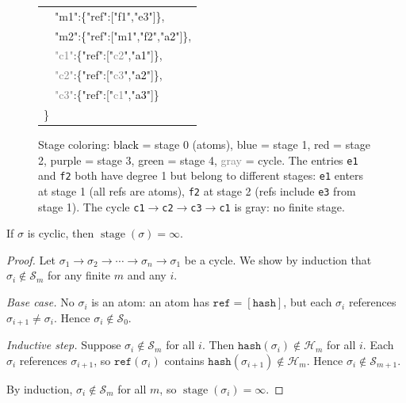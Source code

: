 \begin{figure}[ht]
\begin{minipage}[t]{0.48\textwidth}
{\begin{tabular}{@{}l@{}}
\ \ \textcolor{violet!70!black}{"m1"}:\{"ref":["\textcolor{red!70!black}{f1}","\textcolor{blue!70!black}{e3}"]\},\\
\ \ \textcolor{green!50!black}{"m2"}:\{"ref":["\textcolor{violet!70!black}{m1}","\textcolor{red!70!black}{f2}","\textcolor{black}{a2}"]\},\\
\ \ \textcolor{gray}{"c1"}:\{"ref":["\textcolor{gray}{c2}","\textcolor{black}{a1}"]\},\\
\ \ \textcolor{gray}{"c2"}:\{"ref":["\textcolor{gray}{c3}","\textcolor{black}{a2}"]\},\\
\ \ \textcolor{gray}{"c3"}:\{"ref":["\textcolor{gray}{c1}","\textcolor{black}{a3}"]\}\\
\}
\end{tabular}
}
\end{minipage}
\caption{Stage coloring: \textcolor{black}{black} = stage 0 (atoms), \textcolor{blue!70!black}{blue} = stage 1, \textcolor{red!70!black}{red} = stage 2, \textcolor{violet!70!black}{purple} = stage 3, \textcolor{green!50!black}{green} = stage 4, \textcolor{gray}{gray} = cycle. The entries \texttt{e1} and \texttt{f2} both have degree 1 but belong to different stages: \texttt{e1} enters at stage 1 (all refs are atoms), \texttt{f2} at stage 2 (refs include \texttt{e3} from stage 1). The cycle \texttt{c1}$\to$\texttt{c2}$\to$\texttt{c3}$\to$\texttt{c1} is gray: no finite stage.}
\label{fig:stage-coloring}
\end{figure}

\begin{lemma}
\label{lem:cyclic-infinite}
If $\sigma$ is cyclic, then $\operatorname{stage}(\sigma) = \infty$.
\end{lemma}

\begin{proof}
Let $\sigma_1 \to \sigma_2 \to \cdots \to \sigma_n \to \sigma_1$ be a cycle. We show by induction that $\sigma_i \notin \mathcal{S}_m$ for any finite $m$ and any $i$.

\emph{Base case.} No $\sigma_i$ is an atom: an atom has $\texttt{ref} = [\texttt{hash}]$, but each $\sigma_i$ references $\sigma_{i+1} \neq \sigma_i$. Hence $\sigma_i \notin \mathcal{S}_0$.

\emph{Inductive step.} Suppose $\sigma_i \notin \mathcal{S}_m$ for all $i$. Then $\texttt{hash}(\sigma_i) \notin \mathcal{H}_m$ for all $i$. Each $\sigma_i$ references $\sigma_{i+1}$, so $\texttt{ref}(\sigma_i)$ contains $\texttt{hash}(\sigma_{i+1}) \notin \mathcal{H}_m$. Hence $\sigma_i \notin \mathcal{S}_{m+1}$.

By induction, $\sigma_i \notin \mathcal{S}_m$ for all $m$, so $\operatorname{stage}(\sigma_i) = \infty$.
\end{proof}

